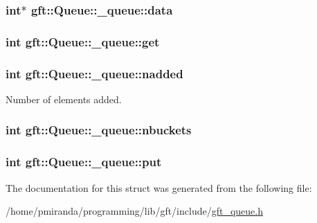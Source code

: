 \subsubsection[{\texorpdfstring{data}{data}}]{\setlength{\rightskip}{0pt plus 5cm}int$\ast$ gft\+::\+Queue\+::\+\_\+queue\+::data}\hypertarget{structgft_1_1Queue_1_1__queue_a306d1f000046c6b8f31cdbaa79073401}{}\label{structgft_1_1Queue_1_1__queue_a306d1f000046c6b8f31cdbaa79073401}
\subsubsection[{\texorpdfstring{get}{get}}]{\setlength{\rightskip}{0pt plus 5cm}int gft\+::\+Queue\+::\+\_\+queue\+::get}\hypertarget{structgft_1_1Queue_1_1__queue_a8c802bf1bbd217d89aea8a71cc3f6ee8}{}\label{structgft_1_1Queue_1_1__queue_a8c802bf1bbd217d89aea8a71cc3f6ee8}
\subsubsection[{\texorpdfstring{nadded}{nadded}}]{\setlength{\rightskip}{0pt plus 5cm}int gft\+::\+Queue\+::\+\_\+queue\+::nadded}\hypertarget{structgft_1_1Queue_1_1__queue_ad93612d6060096d1561bd99327e8b70c}{}\label{structgft_1_1Queue_1_1__queue_ad93612d6060096d1561bd99327e8b70c}


Number of elements added. 

\subsubsection[{\texorpdfstring{nbuckets}{nbuckets}}]{\setlength{\rightskip}{0pt plus 5cm}int gft\+::\+Queue\+::\+\_\+queue\+::nbuckets}\hypertarget{structgft_1_1Queue_1_1__queue_a07cec5556e3d465ec8487e6142071b10}{}\label{structgft_1_1Queue_1_1__queue_a07cec5556e3d465ec8487e6142071b10}
\subsubsection[{\texorpdfstring{put}{put}}]{\setlength{\rightskip}{0pt plus 5cm}int gft\+::\+Queue\+::\+\_\+queue\+::put}\hypertarget{structgft_1_1Queue_1_1__queue_a48a458b35f17d2a4460e8675508e872c}{}\label{structgft_1_1Queue_1_1__queue_a48a458b35f17d2a4460e8675508e872c}


The documentation for this struct was generated from the following file\+:\begin{DoxyCompactItemize}
\item 
/home/pmiranda/programming/lib/gft/include/\hyperlink{gft__queue_8h}{gft\+\_\+queue.\+h}\end{DoxyCompactItemize}
